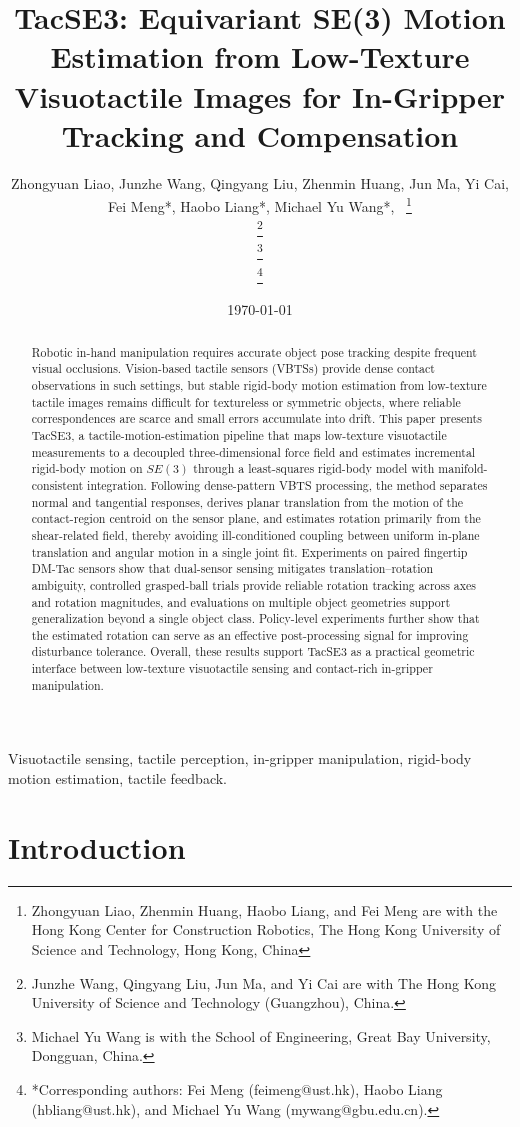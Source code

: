 \documentclass[letterpaper,10pt,journal,twoside]{IEEEtran}
\title{TacSE3: Equivariant SE(3) Motion Estimation from Low-Texture Visuotactile Images for In-Gripper Tracking and Compensation}
\author{
Zhongyuan Liao,
Junzhe Wang,
Qingyang Liu,
Zhenmin Huang,
Jun Ma,
Yi Cai,
Fei Meng*,
Haobo Liang*,
Michael Yu Wang*,~\IEEEmembership{Fellow,~IEEE}
\thanks{
Zhongyuan Liao, Zhenmin Huang, Haobo Liang, and Fei Meng are with the Hong Kong Center for Construction Robotics, 
The Hong Kong University of Science and Technology, Hong Kong, China }

\thanks{
Junzhe Wang, Qingyang Liu, Jun Ma, and Yi Cai are with The Hong Kong University of Science and Technology (Guangzhou), China.
}

\thanks{
Michael Yu Wang is with the School of Engineering, 
Great Bay University, Dongguan, China.
}

\thanks{*Corresponding authors: Fei Meng (feimeng@ust.hk), Haobo Liang (hbliang@ust.hk), and Michael Yu Wang (mywang@gbu.edu.cn).}

}
\date{\today}
\begin{document}
\maketitle

\begin{abstract}

Robotic in-hand manipulation requires accurate object pose tracking despite frequent visual occlusions. Vision-based tactile sensors (VBTSs) provide dense contact observations in such settings, but stable rigid-body motion estimation from low-texture tactile images remains difficult for textureless or symmetric objects, where reliable correspondences are scarce and small errors accumulate into drift.
This paper presents TacSE3, a tactile-motion-estimation pipeline that maps low-texture visuotactile measurements to a decoupled three-dimensional force field and estimates incremental rigid-body motion on $SE(3)$ through a least-squares rigid-body model with manifold-consistent integration. Following dense-pattern VBTS processing, the method separates normal and tangential responses, derives planar translation from the motion of the contact-region centroid on the sensor plane, and estimates rotation primarily from the shear-related field, thereby avoiding ill-conditioned coupling between uniform in-plane translation and angular motion in a single joint fit.
Experiments on paired fingertip DM-Tac sensors show that dual-sensor sensing mitigates translation--rotation ambiguity, controlled grasped-ball trials provide reliable rotation tracking across axes and rotation magnitudes, and evaluations on multiple object geometries support generalization beyond a single object class. Policy-level experiments further show that the estimated rotation can serve as an effective post-processing signal for improving disturbance tolerance. Overall, these results support TacSE3 as a practical geometric interface between low-texture visuotactile sensing and contact-rich in-gripper manipulation.
\end{abstract}

\begin{IEEEkeywords}
Visuotactile sensing, tactile perception, in-gripper manipulation, rigid-body motion estimation,  tactile feedback.
\end{IEEEkeywords}

\section{Introduction}
\label{sec:introduction}
\end{document}
